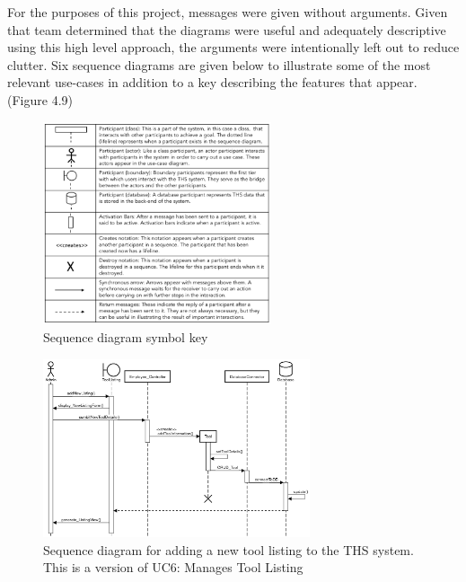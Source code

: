 \documentclass[fontsize=11pt]{extarticle}
\numberwithin{figure}{section} %
\numberwithin{table}{section}%
\begin{document}
For the purposes of this project, messages were given without arguments.
Given that team determined that the diagrams were useful and adequately
descriptive using this high level approach, the arguments were
intentionally left out to reduce clutter. Six sequence diagrams are
given below to illustrate some of the most relevant use-cases in
addition to a key describing the features that appear. (Figure 4.9)

\begin{figure}[H]
      \centering
      \includegraphics[trim = 0 0 0 0, clip, width=0.6\textwidth]{TempImg/SDKey.png}
      \caption{Sequence diagram symbol key}
\end{figure}

\begin{figure}[H]
      \centering
      \includegraphics[trim = 0 0 0 0, clip, width=0.7\textwidth]{TempImg/add_new_tool_SD.png}
      \caption{Sequence diagram for adding a new tool listing to the THS system. This is a version of UC6: Manages Tool Listing}
\end{figure}
\end{document}
